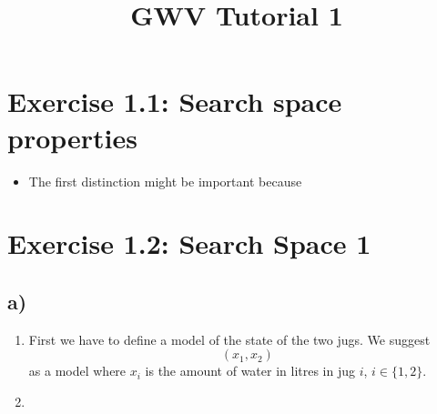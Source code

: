 \documentclass[ngerman]{article}
\date{}
\title{GWV Tutorial 1}
\begin{document}
\section*{Exercise 1.1: Search space properties}
\begin{itemize}
\item The first distinction might be important because
\end{itemize}
\section*{Exercise 1.2: Search Space 1}
\subsection*{a)}
\begin{enumerate}
\item First we have to define a model of the state of the two jugs. We suggest
\[
(x_1,x_2)
\]
as a model where $x_i$ is the amount of water in litres in jug $i$, $i\in\lbrace1,2\rbrace$.
\item 
\end{enumerate}
\end{document}
